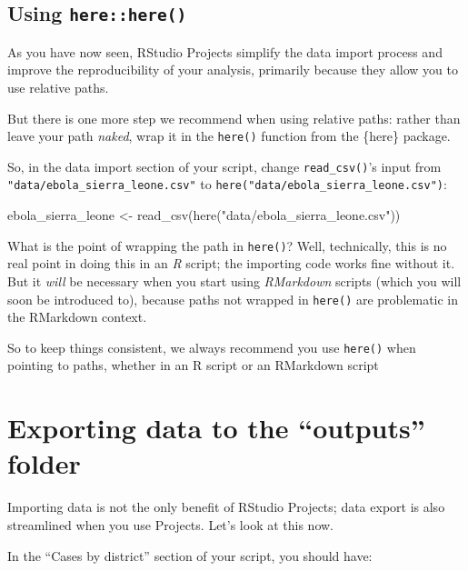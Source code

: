 \documentclass[
  letterpaper,
  DIV=11,
  numbers=noendperiod]{scrreprt}
\newenvironment{Shaded}{\begin{snugshade}}{\end{snugshade}}
\newcommand{\FunctionTok}[1]{\textcolor[rgb]{0.28,0.35,0.67}{#1}}
\newcommand{\NormalTok}[1]{\textcolor[rgb]{0.00,0.23,0.31}{#1}}
\newcommand{\OtherTok}[1]{\textcolor[rgb]{0.00,0.23,0.31}{#1}}
\newcommand{\StringTok}[1]{\textcolor[rgb]{0.13,0.47,0.30}{#1}}
\begin{document}
\subsection{\texorpdfstring{Using
\texttt{here::here()}}{Using here::here()}}\label{using-herehere}

As you have now seen, RStudio Projects simplify the data import process
and improve the reproducibility of your analysis, primarily because they
allow you to use relative paths.

But there is one more step we recommend when using relative paths:
rather than leave your path \emph{naked}, wrap it in the \texttt{here()}
function from the \{here\} package.

So, in the data import section of your script, change
\texttt{read\_csv()}'s input from
\texttt{"data/ebola\_sierra\_leone.csv"} to
\texttt{here("data/ebola\_sierra\_leone.csv")}:

\begin{Shaded}
\begin{Highlighting}[]
\NormalTok{ebola\_sierra\_leone }\OtherTok{\textless{}{-}} \FunctionTok{read\_csv}\NormalTok{(}\FunctionTok{here}\NormalTok{(}\StringTok{"data/ebola\_sierra\_leone.csv"}\NormalTok{))}
\end{Highlighting}
\end{Shaded}

What is the point of wrapping the path in \texttt{here()}? Well,
technically, this is no real point in doing this in an \emph{R} script;
the importing code works fine without it. But it \emph{will} be
necessary when you start using \emph{RMarkdown} scripts (which you will
soon be introduced to), because paths not wrapped in \texttt{here()} are
problematic in the RMarkdown context.

So to keep things consistent, we always recommend you use
\texttt{here()} when pointing to paths, whether in an R script or an
RMarkdown script

\section{Exporting data to the ``outputs''
folder}\label{exporting-data-to-the-outputs-folder}

Importing data is not the only benefit of RStudio Projects; data export
is also streamlined when you use Projects. Let's look at this now.

In the ``Cases by district'' section of your script, you should have:
\end{document}
